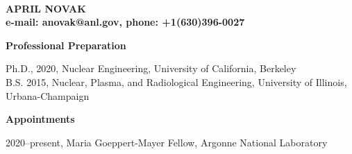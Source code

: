 \documentclass[11pt,letterpaper,english]{article}
\begin{document}
\setlength{\parindent}{0in} %

\pagestyle{fancy}   \renewcommand{%
\headrulewidth}{0.0pt}

\\
{\bf APRIL NOVAK}\\
{\bf e-mail: anovak@anl.gov, phone: +1(630)396-0027} \smallskip

\begin{flushleft} {\bf Professional Preparation}
{\parindent 16pt

Ph.D., 2020, Nuclear Engineering, University of California, Berkeley \\
B.S. 2015, Nuclear, Plasma, and Radiological Engineering, University of Illinois, Urbana-Champaign \\
}

\vspace{.04in}
{\bf Appointments}
{\parindent 16pt

2020--present, Maria Goeppert-Mayer Fellow, Argonne National Laboratory
}


\end{flushleft}
\end{document}
